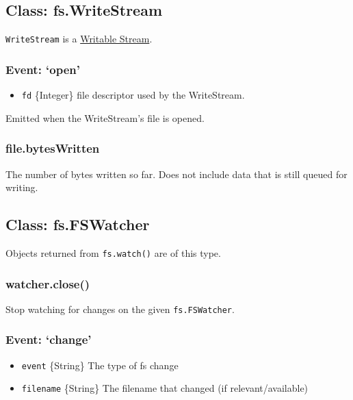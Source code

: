 \subsection{Class: fs.WriteStream}\label{class-fs.writestream}

\texttt{WriteStream} is a
\href{stream.html\#stream_class_stream_writable}{Writable Stream}.

\subsubsection{\texorpdfstring{Event:
`open'}{Event: open}}\label{event-open-1}

\begin{itemize}
\itemsep1pt\parskip0pt
\item
  \texttt{fd} \{Integer\} file descriptor used by the WriteStream.
\end{itemize}

Emitted when the WriteStream's file is opened.

\subsubsection{file.bytesWritten}\label{file.byteswritten}

The number of bytes written so far. Does not include data that is still
queued for writing.

\subsection{Class: fs.FSWatcher}\label{class-fs.fswatcher}

Objects returned from \texttt{fs.watch()} are of this type.

\subsubsection{watcher.close()}\label{watcher.close}

Stop watching for changes on the given \texttt{fs.FSWatcher}.

\subsubsection{\texorpdfstring{Event:
`change'}{Event: change}}\label{event-change}

\begin{itemize}
\itemsep1pt\parskip0pt
\item
  \texttt{event} \{String\} The type of fs change
\item
  \texttt{filename} \{String\} The filename that changed (if
  relevant/available)
\end{itemize}

